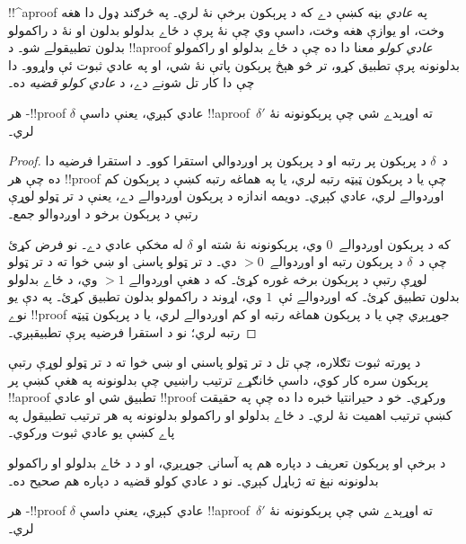 \documentclass[../../../include/open-logic-section]{subfiles}
\begin{document}


!!^a{proof} په \emph{عادي} بڼه کښې دے که د پرېکون
برخې نۀ لري۔ په څرګند ډول دا هغه وخت، او يوازې هغه وخت،
داسې وي چې نۀ پرې د ځاے بدلولو بدلون او نۀ د راکمولو
بدلون تطبيقولے شو۔ د !!a{proof} \emph{عادي کولو} معنا
دا ده چې د ځاے بدلولو او راکمولو بدلونونه پرې تطبيق
کړو، تر څو هېڅ پرېکون پاتې نۀ شي، او په عادي ثبوت ئې
واړوو۔ دا چې دا کار تل شونے دے، د \emph{عادي کولو قضیه} ده۔

\begin{thm}
هر -!!{proof} $\delta$ عادي کېږي، يعنې داسې
!!a{proof}~$\delta'$ ته اوړېدے شي چې پرېکونونه نۀ لري۔
\end{thm}

\begin{proof}
  د~$\delta$ د پرېکون پر رتبه او د پرېکون پر اوږدوالي
  استقرا کوو۔ د استقرا فرضيه دا ده چې هر !!{proof} چې
  يا د پرېکون ټيټه رتبه لري، يا په هماغه رتبه کښې د
  پرېکون کم اوږدوالے لري، عادي کېږي۔
  دويمه اندازه د پرېکون اوږدوالے دے، يعنې د تر ټولو لوړې
  رتبې د پرېکون برخو د اوږدوالو جمع۔

  که د پرېکون اوږدوالے~$0$ وي، پرېکونونه نۀ شته او
  $\delta$ له مخکې عادي دے۔ نو فرض کړئ چې د~$\delta$ د
  پرېکون رتبه او اوږدوالے~$> 0$ دي۔ د تر ټولو پاسنۍ او
  ښي خوا ته د تر ټولو لوړې رتبې د پرېکون برخه غوره
  کړئ۔ که د هغې اوږدوالے $>1$ وي، د ځاے بدلولو بدلون
  تطبيق کړئ۔ که اوږدوالے ئې~$1$ وي، اړوند د راکمولو
  بدلون تطبيق کړئ۔ په دې يو نوے !!{proof} جوړېږي چې يا
  د پرېکون هماغه رتبه او کم اوږدوالے لري، يا د پرېکون
  ټيټه رتبه لري؛ نو د استقرا فرضيه پرې تطبيقېږي۔
\end{proof}

د پورته ثبوت تګلاره، چې تل د تر ټولو پاسني او ښي
خوا ته د تر ټولو لوړې رتبې پرېکون سره کار کوي، داسې
ځانګړے ترتيب راښيي چې بدلونونه په هغې کښې پر
!!a{proof} تطبيق شي او عادي !!{proof} ورکړي۔ خو د
حيرانتيا خبره دا ده چې په حقيقت کښې ترتيب اهميت نۀ
لري۔ د ځاے بدلولو او راکمولو بدلونونه په هر ترتيب
تطبيقول په پاے کښې يو عادي ثبوت ورکوي۔

د برخې او پرېکون تعريف د  دپاره هم په
آسانۍ جوړېږي، او د  د ځاے بدلولو او راکمولو
بدلونونه نېغ  ته ژباړل کېږي۔ نو د عادي کولو
قضیه د  دپاره هم صحيح ده۔

\begin{thm}
هر -!!{proof} $\delta$ عادي کېږي، يعنې داسې
!!a{proof}~$\delta'$ ته اوړېدے شي چې پرېکونونه نۀ لري۔
\end{thm}
\end{document}
